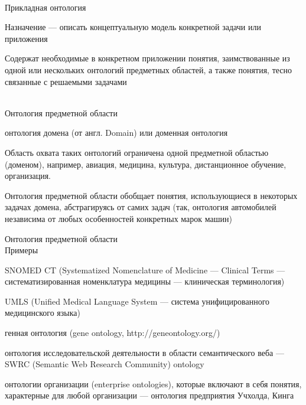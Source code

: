 \begin{frame}{\\Прикладная онтология}
	\topline
	\justifying
	
	\vspace{10mm}
	
	\begin{textitemize}
		\item Назначение --- описать концептуальную модель конкретной задачи или приложения
		\item Содержат необходимые в конкретном приложении понятия, заимствованные из одной или нескольких онтологий предметных областей, а также понятия, тесно связанные с решаемыми задачами
	\end{textitemize}
	
\end{frame}

\begin{frame}{\\Онтология предметной области}
	\topline
	\justifying
	
	\vspace{10mm}
	
	\begin{textitemize}
		\item онтология домена (от англ. Domain) или доменная онтология
		\item Область охвата таких онтологий ограничена одной предметной областью (доменом), например, авиация, медицина, культура, дистанционное обучение, организация.
		\item Онтология предметной области обобщает понятия, использующиеся в некоторых задачах домена, абстрагируясь от самих задач (так, онтология автомобилей независима от любых особенностей конкретных марок машин)
	\end{textitemize}
	
\end{frame}

\begin{frame}{Онтология предметной области\\Примеры}
	\topline
	\justifying
	
	\vspace{10mm}
	\begin{textitemize}
		\item SNOMED CT (Systematized Nomenclature of Medicine --- Clinical Terms --- систематизированная номенклатура медицины --- клиническая терминология)
		\item UMLS (Unified Medical Language System --- система унифицированного медицинского языка)
		\item генная онтология (gene ontology, http://geneontology.org/)
		\item онтология исследовательской деятельности в области семантического веба --- SWRC (Semantic Web Research Community) ontology
		\item онтологии организации (enterprise ontologies), которые включают в себя понятия, характерные для любой организации --- онтология предприятия Учхолда, Кинга
	\end{textitemize}
	
\end{frame}

